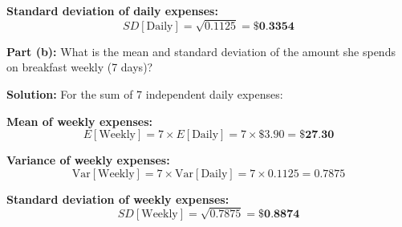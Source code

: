 \documentclass[
  11pt,
]{article}
\begin{document}
\textbf{Standard deviation of daily expenses:}
\[SD[\text{Daily}] = \sqrt{0.1125} = \textbf{\$0.3354}\]

\textbf{Part (b):} What is the mean and standard deviation of the amount
she spends on breakfast weekly (7 days)?

\textbf{Solution:} For the sum of 7 independent daily expenses:

\textbf{Mean of weekly expenses:}
\[E[\text{Weekly}] = 7 \times E[\text{Daily}] = 7 \times \$3.90 = \textbf{\$27.30}\]

\textbf{Variance of weekly expenses:}
\[\text{Var}[\text{Weekly}] = 7 \times \text{Var}[\text{Daily}] = 7 \times 0.1125 = 0.7875\]

\textbf{Standard deviation of weekly expenses:}
\[SD[\text{Weekly}] = \sqrt{0.7875} = \textbf{\$0.8874}\]
\end{document}
